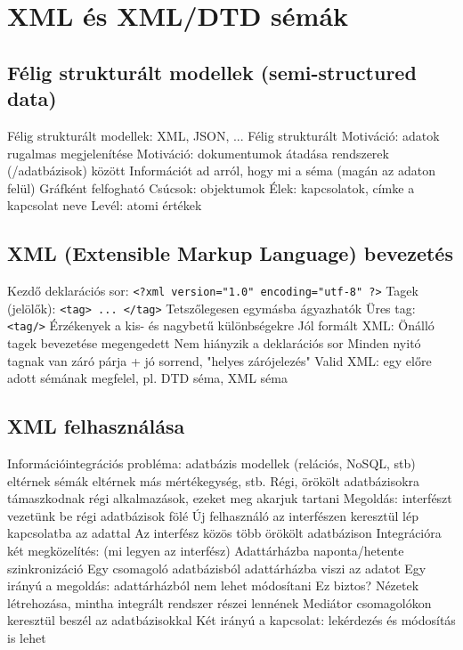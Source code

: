 \documentclass[12pt,a4paper]{article}
\begin{document}
\pagebreak

\section{XML és XML/DTD sémák}

\subsection{Félig strukturált modellek (semi-structured data)}

\begin{outline}
	\1 Félig strukturált modellek: XML, JSON, ...
	\1 Félig strukturált
		\2 Motiváció: adatok rugalmas megjelenítése
		\2 Motiváció: dokumentumok átadása rendszerek (/adatbázisok) között
		\2 Információt ad arról, hogy mi a séma (magán az adaton felül)
	\1 Gráfként felfogható
		\2 Csúcsok: objektumok
		\2 Élek: kapcsolatok, címke a kapcsolat neve
		\2 Levél: atomi értékek
\end{outline}

\subsection{XML (Extensible Markup Language) bevezetés}

\begin{outline}
	\1 Kezdő deklarációs sor: \texttt{<?xml version="1.0" encoding="utf-8" ?>}
	\1 Tagek (jelölők): \texttt{<tag> ... </tag>}
		\2 Tetszőlegesen egymásba ágyazhatók
		\2 Üres tag: \texttt{<tag/>}
		\2 Érzékenyek a kis- és nagybetű különbségekre
	\1 Jól formált XML:
		\2 Önálló tagek bevezetése megengedett
		\2 Nem hiányzik a deklarációs sor
		\2 Minden nyitó tagnak van záró párja + jó sorrend, "helyes zárójelezés"
	\1 Valid XML: egy előre adott sémának megfelel, pl. DTD séma, XML séma
\end{outline}

\pagebreak

\subsection{XML felhasználása}

\begin{outline}
	\1 Információintegrációs probléma:
		\2 adatbázis modellek (relációs, NoSQL, stb) eltérnek
		\2 sémák eltérnek
		\2 más mértékegység, stb.
	\1 Régi, örökölt adatbázisokra támaszkodnak régi alkalmazások, ezeket meg akarjuk tartani
		\2 Megoldás: interfészt vezetünk be régi adatbázisok fölé
		\2 Új felhasználó az interfészen keresztül lép kapcsolatba az adattal
		\2 Az interfész közös több örökölt adatbázison
	\1 Integrációra két megközelítés: (mi legyen az interfész)
		\2 Adattárházba naponta/hetente szinkronizáció
			\3 Egy csomagoló adatbázisból adattárházba viszi az adatot
			\3 Egy irányú a megoldás: adattárházból nem lehet módosítani
				\4 Ez biztos?
		\2 Nézetek létrehozása, mintha integrált rendszer részei lennének
			\3 Mediátor csomagolókon keresztül beszél az adatbázisokkal
			\3 Két irányú a kapcsolat: lekérdezés és módosítás is lehet
\end{outline}
\end{document}
